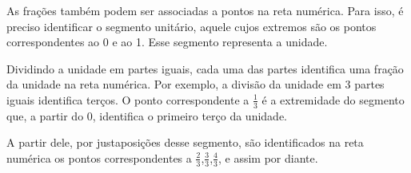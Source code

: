 As frações também podem ser associadas a pontos na reta numérica. Para isso, é preciso identificar o segmento unitário, aquele cujos extremos são os pontos correspondentes ao 0 e ao 1. Esse segmento representa a unidade.
\begin{center}
\end{center}

Dividindo a unidade em partes iguais,  cada uma das partes identifica uma fração da unidade na reta numérica.
Por exemplo, a divisão da unidade em 3 partes iguais identifica terços. O ponto correspondente a $\frac{1}{3}$  é a extremidade do segmento que, a partir do 0, identifica o primeiro terço da unidade. 

\begin{center}
\end{center}


A partir dele, por justaposições desse segmento, são identificados na reta numérica os pontos correspondentes a $\frac{2}{3}$,$\frac{3}{3}$,$\frac{4}{3}$, e assim por diante. 



